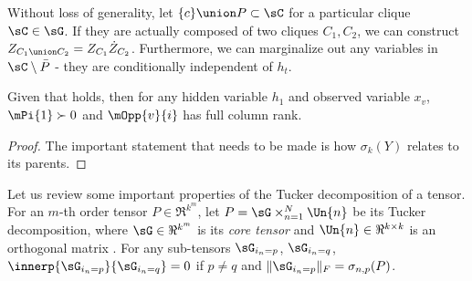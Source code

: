 Without loss of generality, let $\{c\} \union P \subset \sC$ for
a particular clique $\sC \in \sG$. If they are actually composed of two
cliques $C_1, C_2$, we can construct $Z_{C_1 \union C_2} = Z_{C_1} \dot
Z_{C_2}$. Furthermore, we can marginalize out any variables in $\sC
\setminus \bar{P}$ - they are conditionally independent of $h_t$.

\begin{lemma}
  \label{lem:full-rank-suff}
  Given that  holds, then for any hidden
  variable $h_1$ and observed variable $x_v$, $\mPi{1} \succ 0$ and
  $\mOpp{v}{i}$ has full column rank.
\end{lemma}
\begin{proof}
  The important statement that needs to be made is how $\sigma_k(Y)$
  relates to its parents.

\end{proof}

Let us review some important properties of the Tucker decomposition of
  a tensor.
For an $m$-th order tensor $P \in \Re^{k^m}$, let $P = \sG
  \times_{n=1}^N \Un{n}$ be its Tucker decomposition, where $\sG \in
  \Re^{k^m}$ is its {\em core tensor} and $\Un{n} \in \Re^{k\times k}$ is
  an orthogonal matrix \cite{kolda2009tensor}.
For any sub-tensors $\sG_{i_n = p}$, $\sG_{i_n = q}$, $\innerp{\sG_{i_n
  = p}}{\sG_{i_n = q}} = 0$ if $p \neq q$ and $\|\sG_{i_n = p}\|_F
  = \sigma_{n,p}(P)$.

